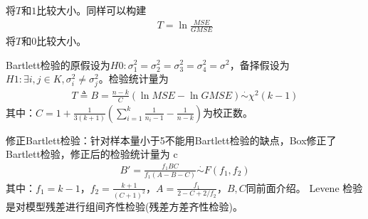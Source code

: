         将$T$和$1$比较大小。同样可以构建
        \begin{align*}
        T = \ln \frac{MSE}{GMSE}
        \end{align*}
        将$T$和$0$比较大小。
        \par
        Bartlett检验的原假设为$H0:\sigma_1^2=\sigma_2^2=\sigma_3^2=\sigma_4^2=\sigma^2$，备择假设为$H1:\exists i,j\in K,\sigma_i^2 \neq \sigma_j^2$。检验统计量为
        \begin{align*}
        T \triangleq B = \frac{n-k}{C} \left( \ln MSE- \ln GMSE \right) \overset{\cdot}{\sim} \chi^2(k-1)
        \end{align*}
        其中：$C = 1+\frac{1}{3(k+1)} \left( \sum\limits_{i=1}^k\frac{1}{n_i-1} -\frac{1}{n-k} \right) $为校正数。
        \par
        修正Bartlett检验：针对样本量小于5不能用Bartlett检验的缺点，Box修正了Bartlett检验，修正后的检验统计量为
c        \begin{align*}
        B' = \frac{f_1 B C}{f_1 (A-B-C)} \overset{\cdot}{\sim} F(f_1,f_2)
        \end{align*}
        其中：$f_1 = k-1$，$f_2 = \frac{k+1}{(C+1)^2}$，$A = \frac{f_1}{2-C+2/f_2}$，$B,C$同前面介绍。
        Levene 检验是对模型残差进行组间齐性检验(残差方差齐性检验)。


